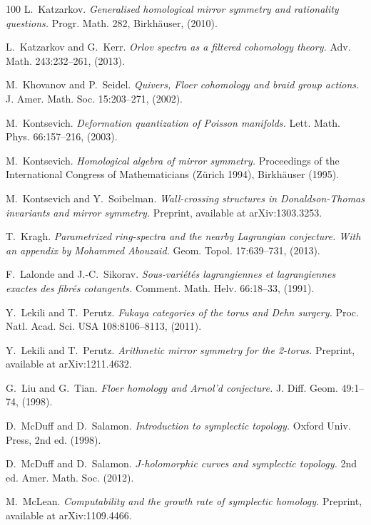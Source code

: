 \documentclass[11pt,a4paper]{article}
\numberwithin{equation}{section}
\begin{document}
\begin{thebibliography}{100}
L.~Katzarkov.
\emph{Generalised homological mirror symmetry and rationality questions.}
Progr. Math. 282, Birkh\"auser, (2010).

L.~Katzarkov and G.~Kerr.
\emph{Orlov spectra as a filtered cohomology theory.}
Adv. Math. 243:232--261, (2013).

M.~Khovanov and P.~Seidel.
\emph{Quivers, Floer cohomology and braid group actions.}
J. Amer. Math. Soc. 15:203--271, (2002).

M.~Kontsevich.
\emph{Deformation quantization of Poisson manifolds.}
Lett. Math. Phys. 66:157--216, (2003).

M.~Kontsevich.
\emph{Homological algebra of mirror symmetry.}
Proceedings of the International Congress of Mathematicians (Z\"urich 1994), Birkh\"auser (1995).

M.~Kontsevich and Y.~Soibelman.
\emph{Wall-crossing structures in Donaldson-Thomas invariants and mirror symmetry.}
Preprint, available at arXiv:1303.3253.

T.~Kragh.
\emph{Parametrized ring-spectra and the nearby Lagrangian conjecture. With an appendix by Mohammed Abouzaid.}
Geom. Topol. 17:639--731, (2013).

F.~Lalonde and J.-C.~Sikorav.
\emph{Sous-vari\'et\'es lagrangiennes et lagrangiennes exactes des fibr\'es cotangents.}
Comment. Math. Helv. 66:18--33, (1991).

Y.~Lekili and T.~Perutz.
\emph{Fukaya categories of the torus and Dehn surgery.}
Proc. Natl. Acad. Sci. USA 108:8106--8113, (2011).

Y.~Lekili and T.~Perutz.
\emph{Arithmetic mirror symmetry for the 2-torus.}
Preprint, available at arXiv:1211.4632.

G.~Liu and G.~Tian.
\emph{Floer homology and Arnol'd conjecture.}
J. Diff. Geom. 49:1--74, (1998).

D.~McDuff and D.~Salamon.
\emph{Introduction to symplectic topology.}
Oxford Univ. Press, 2nd ed. (1998).

D.~McDuff and D.~Salamon.
\emph{$J$-holomorphic curves and symplectic topology.} 2nd ed.
Amer. Math. Soc. (2012).

M.~McLean.
\emph{Computability and the growth rate of symplectic homology.}
Preprint, available at arXiv:1109.4466.


\end{thebibliography}
\end{document}
